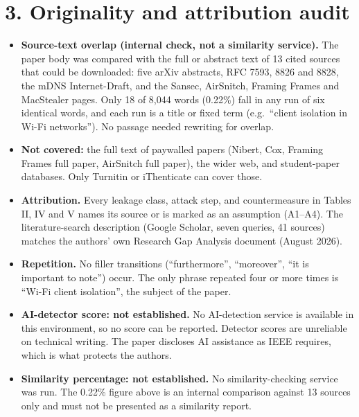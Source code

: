 \documentclass[10pt,a4paper]{article}
\begin{document}
\section*{3. Originality and attribution audit}
\begin{itemize}
\item \textbf{Source-text overlap (internal check, not a similarity service).} The paper body was compared with the full or abstract text of 13 cited sources that could be downloaded: five arXiv abstracts, RFC 7593, 8826 and 8828, the mDNS Internet-Draft, and the Sansec, AirSnitch, Framing Frames and MacStealer pages. Only 18 of 8{,}044 words (0.22\%) fall in any run of six identical words, and each run is a title or fixed term (e.g.\ ``client isolation in Wi-Fi networks''). No passage needed rewriting for overlap.
\item \textbf{Not covered:} the full text of paywalled papers (Nibert, Cox, Framing Frames full paper, AirSnitch full paper), the wider web, and student-paper databases. Only Turnitin or iThenticate can cover those.
\item \textbf{Attribution.} Every leakage class, attack step, and countermeasure in Tables II, IV and V names its source or is marked as an assumption (A1--A4). The literature-search description (Google Scholar, seven queries, 41 sources) matches the authors' own Research Gap Analysis document (August 2026).
\item \textbf{Repetition.} No filler transitions (``furthermore'', ``moreover'', ``it is important to note'') occur. The only phrase repeated four or more times is ``Wi-Fi client isolation'', the subject of the paper.
\item \textbf{AI-detector score: not established.} No AI-detection service is available in this environment, so no score can be reported. Detector scores are unreliable on technical writing. The paper discloses AI assistance as IEEE requires, which is what protects the authors.
\item \textbf{Similarity percentage: not established.} No similarity-checking service was run. The 0.22\% figure above is an internal comparison against 13 sources only and must not be presented as a similarity report.
\end{itemize}
\end{document}
